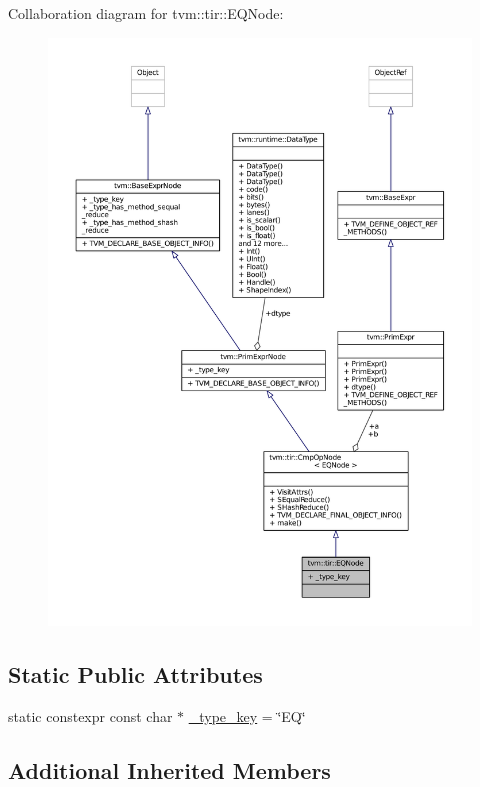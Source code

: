 Collaboration diagram for tvm\+:\+:tir\+:\+:E\+Q\+Node\+:
\nopagebreak
\begin{figure}[H]
\begin{center}
\leavevmode
\includegraphics[width=350pt]{classtvm_1_1tir_1_1EQNode__coll__graph}
\end{center}
\end{figure}
\subsection*{Static Public Attributes}
\begin{DoxyCompactItemize}
\item 
static constexpr const char $\ast$ \hyperlink{classtvm_1_1tir_1_1EQNode_a4b76debb870bae97f07df7196bd4869c}{\+\_\+type\+\_\+key} = \char`\"{}EQ\char`\"{}
\end{DoxyCompactItemize}
\subsection*{Additional Inherited Members}


